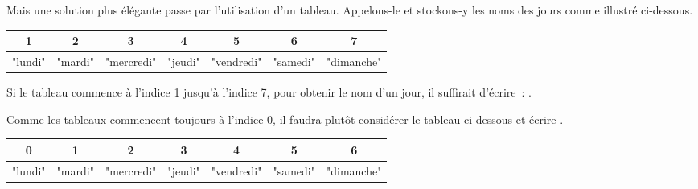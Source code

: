 		Mais une solution plus élégante passe par l’utilisation d’un tableau.
		Appelons-le  et stockons-y les noms des jours
		comme illustré ci-dessous.

		\begin{center}
			\footnotesize
			\begin{tabular}{ccccccc}
				1 & 2 & 3 & 4 & 5 & 6 & 7
				\\\hline
				\multicolumn{1}{|c|}{"lundi"} &
				\multicolumn{1}{c|}{"mardi"} &
				\multicolumn{1}{c|}{"mercredi"} &
				\multicolumn{1}{c|}{"jeudi"} &
				\multicolumn{1}{c|}{"vendredi"} &
				\multicolumn{1}{c|}{"samedi"} &
				\multicolumn{1}{c|}{"dimanche"}
				\\\hline
			\end{tabular}
		\end{center}


		Si le tableau commence à l'indice 1 jusqu'à l'indice 7, pour obtenir le
		nom d’un jour, il suffirait d’écrire~: .
		
		Comme les tableaux commencent toujours à l'indice 0, il faudra plutôt
		considérer le tableau ci-dessous et écrire .
		
		\begin{center}
			\footnotesize
			\begin{tabular}{ccccccc}
				0 &1 & 2 & 3 & 4 & 5 & 6 
				\\\hline
				\multicolumn{1}{|c|}{"lundi"} &
				\multicolumn{1}{c|}{"mardi"} &
				\multicolumn{1}{c|}{"mercredi"} &
				\multicolumn{1}{c|}{"jeudi"} &
				\multicolumn{1}{c|}{"vendredi"} &
				\multicolumn{1}{c|}{"samedi"} &
				\multicolumn{1}{c|}{"dimanche"}
				\\\hline
			\end{tabular}
		\end{center}

		
		
